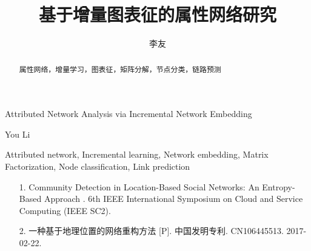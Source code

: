 \documentclass{sysuthesis} %
\numberwithin{algorithm}{chapter}
\theoremstyle{plain}
\theoremstyle{definition}
\theoremstyle{definition}
\begin{document}
\title{基于增量图表征的属性网络研究}{}{Attributed Network Analysis via Incremental Network Embedding}{}

\author{李友}{You Li}




\maketitle

\begin{abstract}{属性网络，增量学习，图表征，矩阵分解，节点分类，链路预测}
  
\end{abstract}

\begin{englishabstract}{Attributed network, Incremental learning, Network embedding, Matrix Factorization, Node classification, Link prediction}
  
\end{englishabstract}

\tableofcontents


\begin{Main} %










%

%

\end{Main} %






\newpage
\printindex %

\begin{Resume}
\begin{itemize}
\item [1.] Community Detection in Location-Based Social Networks: An Entropy-Based Approach . 6th IEEE International Symposium on Cloud and Service Computing (IEEE SC2). 
\item [2.]  一种基于地理位置的网络重构方法 [P]. 中国发明专利. CN106445513. 2017-02-22.


\end{itemize}
\end{Resume}
\end{document}
